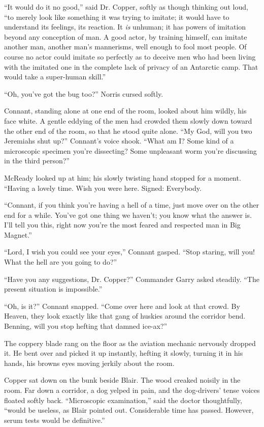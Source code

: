 \documentclass[ebook,oneside,11pt]{memoir}				%
\begin{document}
``It would do it no good,'' said Dr. Copper, softly as though thinking out loud, ``to merely look like something it was trying to imitate; it would have to understand its feelings, its reaction. It \emph{is} unhuman; it has powers of imitation beyond any conception of man. A good actor, by training himself, can imitate another man, another man's mannerisms, well enough to fool most people. Of course no actor could imitate so perfectly as to deceive men who had been living with the imitated one in the complete lack of privacy of an Antarctic camp. That would take a super-human skill.''

``Oh, you've got the bug too?'' Norris cursed softly.

Connant, standing alone at one end of the room, looked about him wildly, his face white. A gentle eddying of the men had crowded them slowly down toward the other end of the room, so that he stood quite alone. ``My God, will you two Jeremiahs shut up?'' Connant's voice shook. ``What am I? Some kind of a microscopic specimen you're dissecting? Some unpleasant worm you're discussing in the third person?''

McReady looked up at him; his slowly twisting hand stopped for a moment. ``Having a lovely time. Wish you were here. Signed: Everybody.

``Connant, if you think you're having a hell of a time, just move over on the other end for a while. You've got one thing we haven't; you know what the answer is. I'll tell you this, right now you're the most feared and respected man in Big Magnet.''

``Lord, I wish you could see your eyes,'' Connant gasped. ``Stop staring, will you! What the hell are you going to do?''

``Have you any suggestions, Dr. Copper?'' Commander Garry asked steadily. ``The present situation is impossible.''

``Oh, is it?'' Connant snapped. ``Come over here and look at that crowd. By Heaven, they look exactly like that gang of huskies around the corridor bend. Benning, will you stop hefting that damned ice-ax?''

The coppery blade rang on the floor as the aviation mechanic nervously dropped it. He bent over and picked it up instantly, hefting it slowly, turning it in his hands, his browns eyes moving jerkily about the room.

Copper sat down on the bunk beside Blair. The wood creaked noisily in the room. Far down a corridor, a dog yelped in pain, and the dog-drivers' tense voices floated softly back. ``Microscopic examination,'' said the doctor thoughtfully, ``would be useless, as Blair pointed out. Considerable time has passed. However, serum tests would be definitive.''
\end{document}
